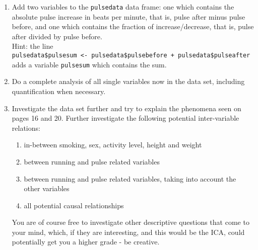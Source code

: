 \begin{enumerate}
\item Add two variables to the \texttt{pulsedata} data frame: one which contains the absolute pulse increase in beats per minute, that is, pulse after minus pulse before, and one which contains the fraction of increase/decrease, that is, pulse after divided by pulse before.\\
    Hint: the line\\
    \texttt{pulsedata\$pulsesum <- pulsedata\$pulsebefore + pulsedata\$pulseafter}\\
    adds a variable \texttt{pulsesum} which contains the sum.

\item Do a complete analysis of all single variables now in the data set, including quantification when necessary.

\item Investigate the data set further and try to explain the phenomena seen on pages 16 and 20. Further investigate the following potential inter-variable relations:
\begin{enumerate}
\item in-between smoking, sex, activity level, height and weight
\item between running and pulse related variables
\item between running and pulse related variables, taking into account the other variables
\item all potential causal relationships
\end{enumerate}
You are of course free to investigate other descriptive questions that come to your mind, which, if they are interesting, and this would be the ICA, could potentially get you a higher grade - be creative.


\end{enumerate}

